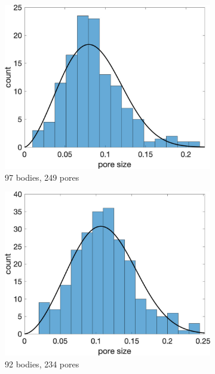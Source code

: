 \documentclass[preprint,10pt]{elsarticle}
\begin{document}
\begin{figure}[H]
\begin{subfigure}[b]{0.3\textwidth}
\includegraphics*[width =\linewidth]{./figs/hist100b_112}
\caption{97 bodies, 249 pores}
\end{subfigure}
\begin{subfigure}[b]{0.3\textwidth}
\includegraphics*[width =\linewidth]{./figs/hist100b_164}
\caption{92 bodies, 234 pores}
\end{subfigure}%
\begin{subfigure}[b]{0.3\textwidth}

\end{subfigure}
\end{figure}
\end{document}
